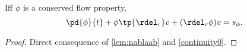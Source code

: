 \begin{thm}
Iff $\phi$ is a conserved flow property,
\begin{equation}
    \label{continuity}
    \pd{\phi}{t} + \phi \tp{\rdel_r} v +  (\rdel_r \phi) v = s_\phi.
\end{equation}
\end{thm}
\begin{proof}
    Direct consequence of \autoref{lem:nablaab} and \autoref{continuity0}.
\end{proof}

